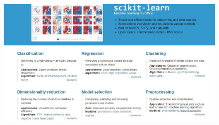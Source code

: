 \documentclass[MASTER.tex]{subfiles}
\begin{document}
 
	
%	
%	
%
%
%
%
\begin{frame}
	\begin{figure}
\centering
\includegraphics[width=1.2\linewidth]{SKLsite}

\end{figure}

\end{frame}
\end{document}
